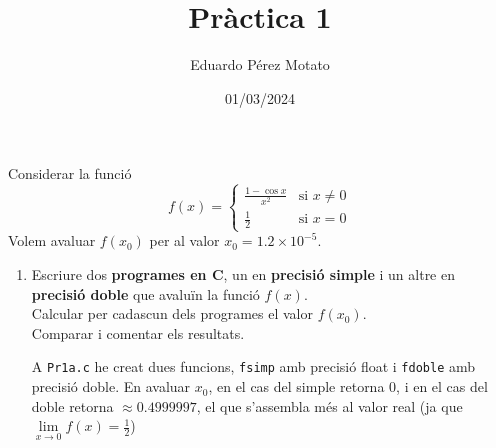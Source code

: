 \documentclass[a4paper, 12pt]{article}
\title{Pràctica 1}
\author{Eduardo Pérez Motato}
\date{01/03/2024}
\begin{document}
    \makeheader

    \begin{exercici}
        Considerar la funció
        \begin{equation}
            f\left(x\right) = 
            \begin{cases}
                \frac{1-\cos{x}}{x^2} & \text{si } x \neq 0\\
                \frac{1}{2} & \text{si } x = 0
            \end{cases}
            \label{eq:1}
        \end{equation}
        Volem avaluar $f(x_0)$ per al valor $x_0 = 1.2 \times 10^{-5}$.
        \begin{enumerate}[label=\alph*)]
            \item Escriure dos \textbf{programes en C}, un en \textbf{precisió simple} i un altre en
            \textbf{precisió doble} que avaluïn la funció $f\left(x\right)$.\\
            Calcular per cadascun dels programes el valor $f\left(x_0\right)$.\\
            Comparar i comentar els resultats.\\
            \begin{solucio}
                A \verb|Pr1a.c| he creat dues funcions, \verb|fsimp| amb precisió float i \verb|fdoble|
                amb precisió doble. En avaluar $x_0$, en el cas del simple retorna $0$, i en el cas
                del doble retorna $\approx 0.4999997$, el que s'assembla més al valor real (ja que
                $\lim\limits_{x \to 0} f\left(x\right) = \frac{1}{2}$) 
            \end{solucio}
        \end{enumerate}
    \end{exercici}
\end{document}
